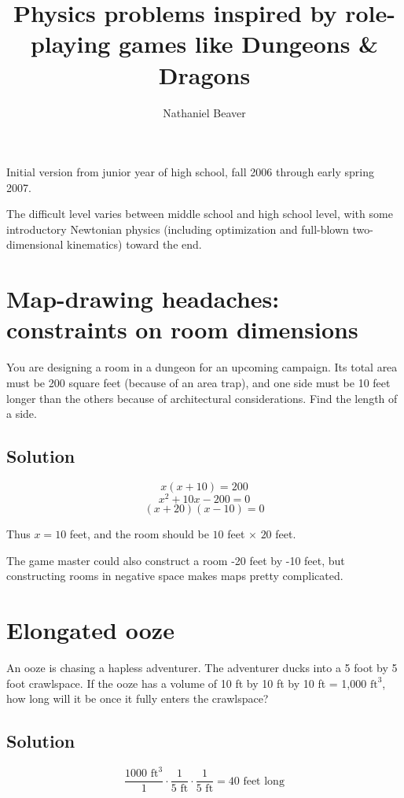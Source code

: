 \documentclass[12pt,letterpaper]{article}
\author{Nathaniel Beaver}
\title{Physics problems inspired by role-playing games like Dungeons \& Dragons}
\begin{document}
\maketitle

Initial version from junior year of high school, fall 2006 through early spring 2007.

The difficult level varies between middle school and high school level, with some introductory Newtonian physics (including optimization and full-blown two-dimensional kinematics) toward the end.

\section{Map-drawing headaches: constraints on room dimensions}

You are designing a room in a dungeon for an upcoming campaign. Its total area must be 200 square feet (because of an area trap), and one side must be 10 feet longer than the others because of architectural considerations. Find the length of a side.

\subsection{Solution}

\[x(x+10) = 200\]
\[x^2 + 10x - 200 = 0\]
\[(x+20)(x-10) = 0\]

Thus $x = 10$ feet, and the room should be $10$ feet $\times$ $20$ feet.

The game master could also construct a room -20 feet by -10 feet, but constructing rooms in negative space makes maps pretty complicated.

\section{Elongated ooze}

An ooze is chasing a hapless adventurer. The adventurer ducks into a 5 foot by 5 foot crawlspace. If the ooze has a volume of 10 ft by 10 ft by 10 ft = 1,000 $\textrm{ft}^3$, how long will it be once it fully enters the crawlspace?

\subsection{Solution}

\[
\frac{1000 \textrm{ ft}^3}{1}
\cdot
\frac{1}{5 \textrm{ ft}}
\cdot
\frac{1}{5 \textrm{ ft}}
=
40 \textrm{ feet long}
\]
\end{document}
